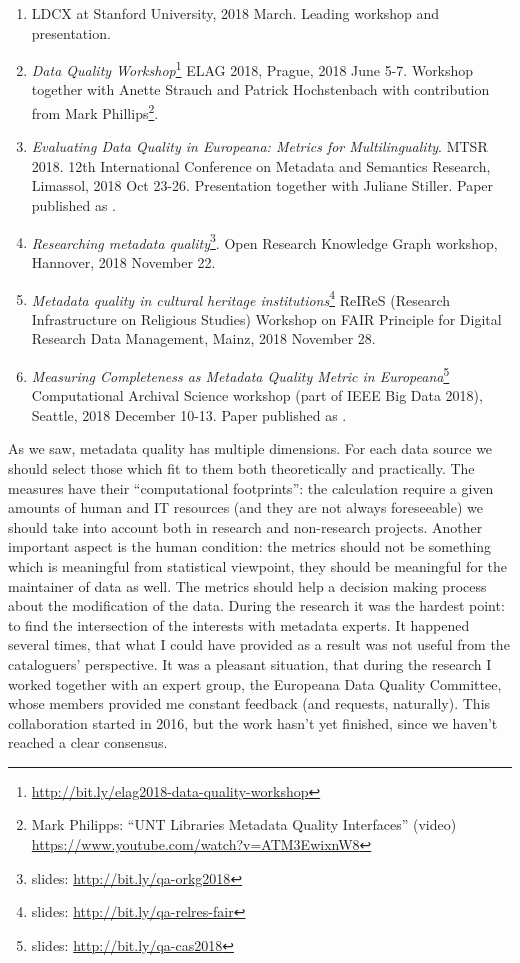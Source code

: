 \begin{enumerate}
\item LDCX at Stanford University, 2018 March. Leading workshop and presentation.
\item \emph{Data Quality Workshop}\footnote{\url{http://bit.ly/elag2018-data-quality-workshop}} ELAG 2018, Prague, 2018 June 5-7. Workshop together with Anette Strauch and Patrick Hochstenbach with contribution from Mark Phillips\footnote{Mark Philipps: ``UNT Libraries Metadata Quality Interfaces'' (video) \url{https://www.youtube.com/watch?v=ATM3EwixnW8}}.
\item \emph{Evaluating Data Quality in Europeana:
Metrics for Multilinguality}. MTSR 2018. 12th International Conference on Metadata and Semantics Research, Limassol, 2018 Oct 23-26. Presentation together with Juliane Stiller. Paper published as \cite{kiraly-et-al2018}.
\item \emph{Researching metadata quality}\footnote{slides: \url{http://bit.ly/qa-orkg2018}}. Open Research Knowledge Graph workshop, Hannover, 2018 November 22.
\item \emph{Metadata quality in cultural heritage institutions}\footnote{slides: \url{http://bit.ly/qa-relres-fair}} ReIReS (Research Infrastructure on Religious Studies) Workshop on FAIR Principle for Digital Research Data Management, Mainz, 2018 November 28.
\item \emph{Measuring Completeness as Metadata Quality Metric in Europeana}\footnote{slides: \url{http://bit.ly/qa-cas2018}} Computational Archival Science workshop (part of IEEE Big Data 2018), Seattle, 2018 December 10-13. Paper published as \cite{kiraly2018}.
\end{enumerate}

As we saw, metadata quality has multiple dimensions. For each data source we should select those which fit to them both theoretically and practically. The measures have their ``computational footprints'': the calculation require a given amounts of human and IT resources (and they are not always foreseeable) we should take into account both in research and non-research projects. Another important aspect is the human condition: the metrics should not be something which is meaningful from statistical viewpoint, they should be meaningful for the maintainer of data as well. The metrics should help a decision making process about the modification of the data. During the research it was the hardest point: to find the intersection of the interests with metadata experts. It happened several times, that what I could have provided as a result was not useful from the cataloguers' perspective. It was a pleasant situation, that during the research I worked together with an expert group, the Europeana Data Quality Committee, whose members provided me constant feedback (and requests, naturally). This collaboration started in 2016, but the work hasn't yet finished, since we haven't reached a clear consensus.

